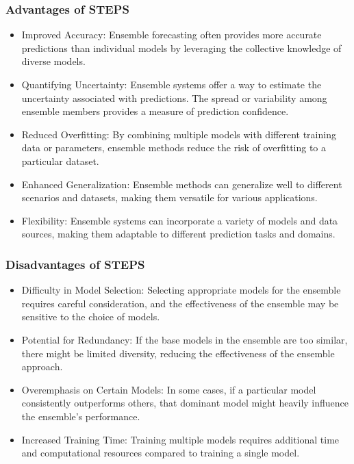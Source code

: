 \documentclass[../paper.tex]{subfiles}
\begin{document}
    \subsubsection{Advantages of STEPS}
        \begin{itemize}
            \item Improved Accuracy:
            Ensemble forecasting often provides more accurate predictions than individual models
            by leveraging the collective knowledge of diverse models.

            \item Quantifying Uncertainty: Ensemble systems offer a way to estimate the uncertainty associated with predictions.
            The spread or variability among ensemble members provides a measure of prediction confidence.

            \item Reduced Overfitting:
            By combining multiple models with different training data or parameters,
            ensemble methods reduce the risk of overfitting to a particular dataset.

            \item Enhanced Generalization: Ensemble methods can generalize well to different scenarios and datasets,
            making them versatile for various applications.

            \item Flexibility: Ensemble systems can incorporate a variety of models and data sources,
            making them adaptable to different prediction tasks and domains.
        \end{itemize}
    \subsubsection{Disadvantages of STEPS}
        \begin{itemize}
            \item Difficulty in Model Selection:
            Selecting appropriate models for the ensemble requires careful consideration,
            and the effectiveness of the ensemble may be sensitive to the choice of models.

            \item Potential for Redundancy: If the base models in the ensemble are too similar,
            there might be limited diversity, reducing the effectiveness of the ensemble approach.

            \item Overemphasis on Certain Models:
            In some cases, if a particular model consistently outperforms others,
            that dominant model might heavily influence the ensemble's performance.

            \item Increased Training Time:
            Training multiple models requires additional time and computational resources compared to training a single model.
        \end{itemize}
\end{document}
